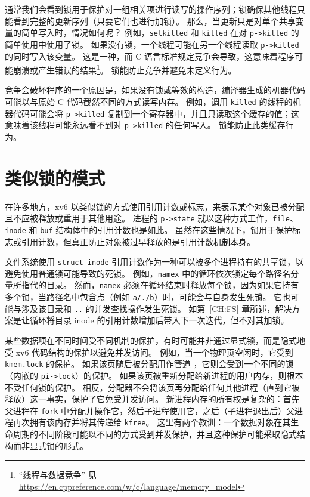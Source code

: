 通常我们会看到锁用于保护对一组相关项进行读写的操作序列；锁确保其他线程只能看到完整的更新序列（只要它们也进行加锁）。
那么，当更新只是对单个共享变量的简单写入时，情况如何呢？
例如，\texttt{setkilled} 和 \texttt{killed}  在对 \lstinline{p->killed} 的简单使用中使用了锁。
如果没有锁，一个线程可能在另一个线程读取 \lstinline{p->killed} 的同时写入该变量。
这是一种，而 C 语言标准规定竞争会导致，这意味着程序可能崩溃或产生错误的结果\footnote{“线程与数据竞争” 见 \url{https://en.cppreference.com/w/c/language/memory_model}}。
锁能防止竞争并避免未定义行为。

竞争会破坏程序的一个原因是，如果没有锁或等效的构造，编译器生成的机器代码可能以与原始 C 代码截然不同的方式读写内存。
例如，调用 \texttt{killed} 的线程的机器代码可能会将 \lstinline{p->killed} 复制到一个寄存器中，并且只读取这个缓存的值；这意味着该线程可能永远看不到对 \lstinline{p->killed} 的任何写入。
锁能防止此类缓存行为。


\section{类似锁的模式}

在许多地方，xv6 以类似锁的方式使用引用计数或标志，来表示某个对象已被分配且不应被释放或重用于其他用途。
进程的 {\tt p->state} 就以这种方式工作，{\tt file}、{\tt inode} 和 {\tt buf} 结构体中的引用计数也是如此。
虽然在这些情况下，锁用于保护标志或引用计数，但真正防止对象被过早释放的是引用计数机制本身。

文件系统使用 {\tt struct inode} 引用计数作为一种可以被多个进程持有的共享锁，以避免使用普通锁可能导致的死锁。
例如，{\tt namex}  中的循环依次锁定每个路径名分量所指代的目录。
然而，{\tt namex} 必须在循环结束时释放每个锁，因为如果它持有多个锁，当路径名中包含点（例如 {\tt a/./b}）时，可能会与自身发生死锁。
它也可能与涉及该目录和 {\tt ..} 的并发查找操作发生死锁。
如第~\ref{CH:FS} 章所述，解决方案是让循环将目录 inode 的引用计数增加后带入下一次迭代，但不对其加锁。

某些数据项在不同时间受不同机制的保护，有时可能并非通过显式锁，而是隐式地受 xv6 代码结构的保护以避免并发访问。
例如，当一个物理页空闲时，它受到 \texttt{kmem.lock}  的保护。
如果该页随后被分配用作管道 ，它则会受到一个不同的锁（内嵌的 \lstinline{pi->lock}）的保护。
如果该页被重新分配给新进程的用户内存，则根本不受任何锁的保护。
相反，分配器不会将该页再分配给任何其他进程（直到它被释放）这一事实，保护了它免受并发访问。
新进程内存的所有权是复杂的：首先父进程在 {\tt fork} 中分配并操作它，然后子进程使用它，之后（子进程退出后）父进程再次拥有该内存并将其传递给 {\tt kfree}。
这里有两个教训：一个数据对象在其生命周期的不同阶段可能以不同的方式受到并发保护，并且这种保护可能采取隐式结构而非显式锁的形式。

